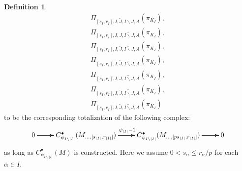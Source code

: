 \documentclass[12pt]{amsart}
\theoremstyle{definition}
\newtheorem{definition}[theorem]{Definition}
\numberwithin{equation}{section}
\begin{document}
\begin{definition}
\begin{align}
\Pi_{[s_I,r_I],I,\widetilde{J},I\backslash J,A}(\pi_{K_I}),\\
\Pi_{[s_I,r_I],I,J,\breve{I\backslash J},A}(\pi_{K_I}),\\	
\Pi_{[s_I,r_I],I,\breve{J},\breve{I\backslash J},A}(\pi_{K_I}),\\
\Pi_{[s_I,r_I],I,\widetilde{J},\breve{I\backslash J},A}(\pi_{K_I}),\\
\Pi_{[s_I,r_I],I,J,\widetilde{I\backslash J},A}(\pi_{K_I}),\\	
\Pi_{[s_I,r_I],I,\breve{J},\widetilde{I\backslash J},A}(\pi_{K_I}),\\
\Pi_{[s_I,r_I],I,\widetilde{J},\widetilde{I\backslash J},A}(\pi_{K_I})	
\end{align}	
to be the corresponding totalization of the following complex:
\[
\xymatrix@C+0pc@R+0pc{
0 \ar[r] \ar[r] \ar[r] &C^\bullet_{\psi_{I\backslash |I|}}(M_{...,[s_{|I|},r_{|I|}]}) \ar[r]^{\psi_{|I|}-1}\ar[r]\ar[r] &C^\bullet_{\psi_{I\backslash |I|}}(M_{...,[ps_{|I|},r_{|I|}]}) \ar[r] \ar[r] \ar[r] &0
}
\]
as long as $C^\bullet_{\psi_{I\backslash |I|}}(M)$ is constructed. Here we assume $0< s_\alpha \leq r_\alpha/p$ for each $\alpha\in I$.	
\end{definition}
\end{document}
